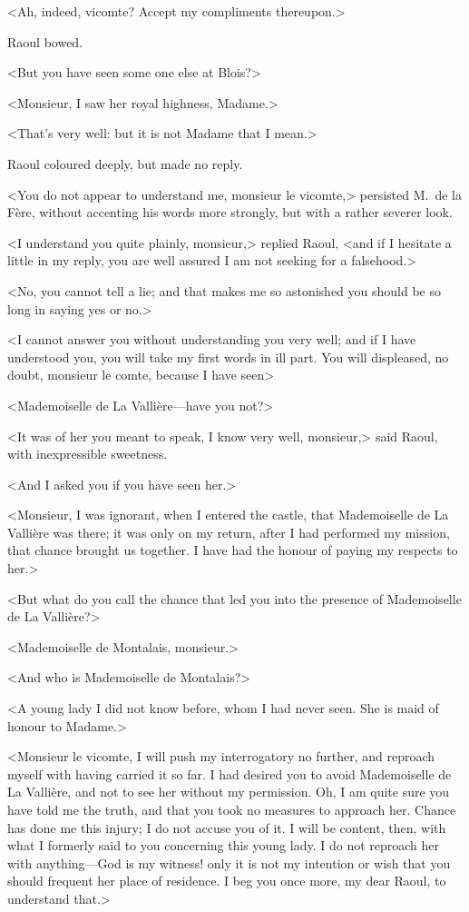 <Ah, indeed, vicomte? Accept my compliments thereupon.>

Raoul bowed.

<But you have seen some one else at Blois?>

<Monsieur, I saw her royal highness, Madame.>

<That's very well: but it is not Madame that I mean.>

Raoul coloured deeply, but made no reply.

<You do not appear to understand me, monsieur le vicomte,> persisted M.~de la Fère, without accenting his words more strongly, but with a rather severer look.

<I understand you quite plainly, monsieur,> replied Raoul, <and if I hesitate a little in my reply, you are well assured I am not seeking for a falsehood.>

<No, you cannot tell a lie; and that makes me so astonished you should be so long in saying yes or no.>

<I cannot answer you without understanding you very well; and if I have understood you, you will take my first words in ill part. You will displeased, no doubt, monsieur le comte, because I have seen\longdash>

<Mademoiselle de La Vallière—have you not?>

<It was of her you meant to speak, I know very well, monsieur,> said Raoul, with inexpressible sweetness.

<And I asked you if you have seen her.>

<Monsieur, I was ignorant, when I entered the castle, that Mademoiselle de La Vallière was there; it was only on my return, after I had performed my mission, that chance brought us together. I have had the honour of paying my respects to her.>

<But what do you call the chance that led you into the presence of Mademoiselle de La Vallière?>

<Mademoiselle de Montalais, monsieur.>

<And who is Mademoiselle de Montalais?>

<A young lady I did not know before, whom I had never seen. She is maid of honour to Madame.>

<Monsieur le vicomte, I will push my interrogatory no further, and reproach myself with having carried it so far. I had desired you to avoid Mademoiselle de La Vallière, and not to see her without my permission. Oh, I am quite sure you have told me the truth, and that you took no measures to approach her. Chance has done me this injury; I do not accuse you of it. I will be content, then, with what I formerly said to you concerning this young lady. I do not reproach her with anything—God is my witness! only it is not my intention or wish that you should frequent her place of residence. I beg you once more, my dear Raoul, to understand that.>

